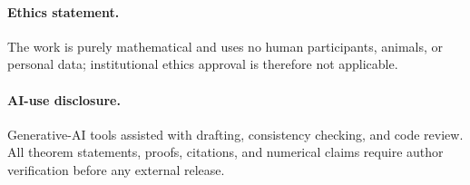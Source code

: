 \paragraph{Ethics statement.}
The work is purely mathematical and uses no human participants, animals, or
personal data; institutional ethics approval is therefore not applicable.

\paragraph{AI-use disclosure.}
Generative-AI tools assisted with drafting, consistency checking, and code
review.  All theorem statements, proofs, citations, and numerical claims
require author verification before any external release.

